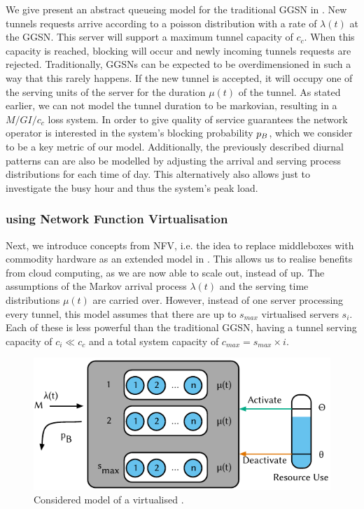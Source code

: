 We give present an abstract queueing model for the traditional \gls{GGSN} in .
New tunnels requests arrive according to a poisson distribution with a rate of \(\lambda(t)\) at the \gls{GGSN}.
This server will support a maximum tunnel capacity of \(c_c\).
When this capacity is reached, blocking will occur and newly incoming tunnels requests are rejected.
Traditionally, \glspl{GGSN} can be expected to be overdimensioned in such a way that this rarely happens.
If the new tunnel is accepted, it will occupy one of the serving units of the server for the duration \(\mu(t)\) of the tunnel.
As stated earlier, we can not model the tunnel duration to be markovian, resulting in a  \(M/GI/c_c\) loss system.
In order to give quality of service guarantees the network operator is interested in the system's blocking probability \(p_B\), which we consider to be a key metric of our model.
Additionally, the previously described diurnal patterns can are also be modelled by adjusting the arrival and serving process distributions for each time of day.
This alternatively also allows just to investigate the busy hour and thus the system's peak load.

\subsubsection*{ using Network Function Virtualisation}\label{sec:cloud:virtualized_network_functions:model:virtual_ggsn}
Next, we introduce concepts from \gls{NFV}, i.e. the idea to replace middleboxes with commodity hardware as an extended model in . 
This allows us to realise benefits from cloud computing, as we are now able to scale out, instead of up.
The assumptions of the Markov arrival process \(\lambda(t)\) and the serving time distributions \(\mu(t)\) are carried over.
However, instead of one server processing every tunnel, this model assumes that there are up to \(s_{max}\) virtualised servers \(s_i\).
Each of these is less powerful than the traditional \gls{GGSN}, having a tunnel serving capacity of \(c_i \ll c_c\) and a total system capacity of \(c_{max} = s_{max} \times i\).

\begin{figure}
  \centering
  \includegraphics{cloud/virtualized_network_functions/model/figures/virtual_ggsn}
  \caption{Considered model of a virtualised .}
  \label{sec:cloud:virtualized_network_functions:model:virtual_ggsn:model}
\end{figure} 

